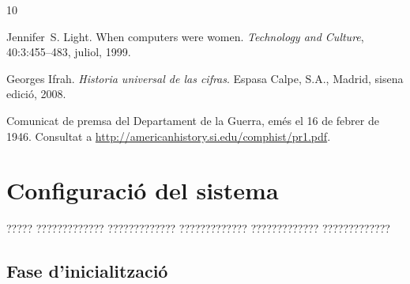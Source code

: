 \documentclass[11pt,spanish,listoffigures,listoftables]{tfgetsinf}
\begin{document}
\begin{thebibliography}{10}

   Jennifer~S. Light.
   \newblock When computers were women.
   \newblock \textit{Technology and Culture}, 40:3:455--483, juliol, 1999.

   Georges Ifrah.
   \newblock \textit{Historia universal de las cifras}.
   \newblock Espasa Calpe, S.A., Madrid, sisena edició, 2008.

   Comunicat de premsa del Departament de la Guerra, 
   emés el 16 de febrer de 1946. 
   \newblock Consultat a 
   \url{http://americanhistory.si.edu/comphist/pr1.pdf}.

\end{thebibliography}
\cleardoublepage


\APPENDIX


\chapter{Configuració del sistema}

????? ????????????? ????????????? ????????????? ????????????? ?????????????

\section{Fase d'inicialització}
\end{document}
